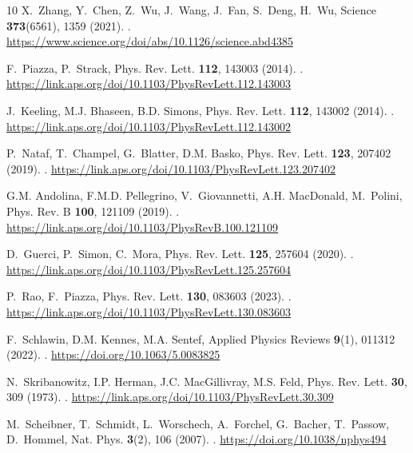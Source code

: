 \begin{thebibliography}{10}
X.~Zhang, Y.~Chen, Z.~Wu, J.~Wang, J.~Fan, S.~Deng, H.~Wu, Science
  \textbf{373}(6561), 1359 (2021).
\newblock {}.
\newblock
  \urlprefix\url{https://www.science.org/doi/abs/10.1126/science.abd4385}

F.~Piazza, P.~Strack, Phys. Rev. Lett. \textbf{112}, 143003 (2014).
\newblock {}.
\newblock
  \urlprefix\url{https://link.aps.org/doi/10.1103/PhysRevLett.112.143003}

J.~Keeling, M.J. Bhaseen, B.D. Simons, Phys. Rev. Lett. \textbf{112}, 143002
  (2014).
\newblock {}.
\newblock
  \urlprefix\url{https://link.aps.org/doi/10.1103/PhysRevLett.112.143002}

P.~Nataf, T.~Champel, G.~Blatter, D.M. Basko, Phys. Rev. Lett. \textbf{123},
  207402 (2019).
\newblock {}.
\newblock
  \urlprefix\url{https://link.aps.org/doi/10.1103/PhysRevLett.123.207402}

G.M. Andolina, F.M.D. Pellegrino, V.~Giovannetti, A.H. MacDonald, M.~Polini,
  Phys. Rev. B \textbf{100}, 121109 (2019).
\newblock {}.
\newblock \urlprefix\url{https://link.aps.org/doi/10.1103/PhysRevB.100.121109}

D.~Guerci, P.~Simon, C.~Mora, Phys. Rev. Lett. \textbf{125}, 257604 (2020).
\newblock {}.
\newblock
  \urlprefix\url{https://link.aps.org/doi/10.1103/PhysRevLett.125.257604}

P.~Rao, F.~Piazza, Phys. Rev. Lett. \textbf{130}, 083603 (2023).
\newblock {}.
\newblock
  \urlprefix\url{https://link.aps.org/doi/10.1103/PhysRevLett.130.083603}

F.~Schlawin, D.M. Kennes, M.A. Sentef, Applied Physics Reviews \textbf{9}(1),
  011312 (2022).
\newblock {}.
\newblock \urlprefix\url{https://doi.org/10.1063/5.0083825}

N.~Skribanowitz, I.P. Herman, J.C. MacGillivray, M.S. Feld, Phys. Rev. Lett.
  \textbf{30}, 309 (1973).
\newblock {}.
\newblock \urlprefix\url{https://link.aps.org/doi/10.1103/PhysRevLett.30.309}

M.~Scheibner, T.~Schmidt, L.~Worschech, A.~Forchel, G.~Bacher, T.~Passow,
  D.~Hommel, Nat. Phys. \textbf{3}(2), 106 (2007).
\newblock {}.
\newblock \urlprefix\url{https://doi.org/10.1038/nphys494}


\end{thebibliography}
